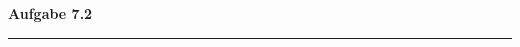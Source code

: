 \begin{centering}
  \LARGE{\textbf{Aufgabe 7.2}}\\
  \vspace*{20pt}

 \end{centering}

 \vspace*{10pt}

 \rule{\textwidth}{1pt}

